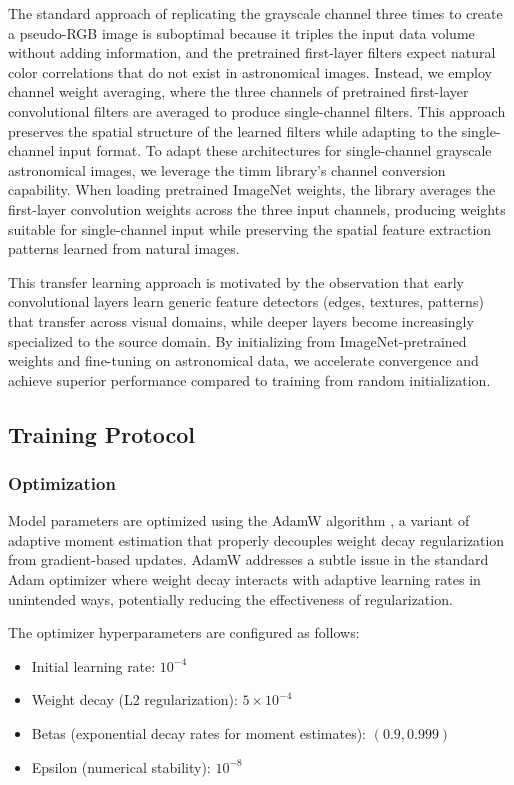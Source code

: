 \documentclass[11pt,a4paper]{article}
\begin{document}
The standard approach of replicating the grayscale channel three times to create a pseudo-RGB image is suboptimal because it triples the input data volume without adding information, and the pretrained first-layer filters expect natural color correlations that do not exist in astronomical images. Instead, we employ channel weight averaging, where the three channels of pretrained first-layer convolutional filters are averaged to produce single-channel filters. This approach preserves the spatial structure of the learned filters while adapting to the single-channel input format. To adapt these architectures for single-channel grayscale astronomical images, we leverage the timm library's channel conversion capability. When loading pretrained ImageNet weights, the library averages the first-layer convolution weights across the three input channels, producing weights suitable for single-channel input while preserving the spatial feature extraction patterns learned from natural images.

This transfer learning approach is motivated by the observation that early convolutional layers learn generic feature detectors (edges, textures, patterns) that transfer across visual domains, while deeper layers become increasingly specialized to the source domain. By initializing from ImageNet-pretrained weights and fine-tuning on astronomical data, we accelerate convergence and achieve superior performance compared to training from random initialization.

\subsection{Training Protocol}

\subsubsection{Optimization}

Model parameters are optimized using the AdamW algorithm \citep{loshchilov2019decoupled}, a variant of adaptive moment estimation that properly decouples weight decay regularization from gradient-based updates. AdamW addresses a subtle issue in the standard Adam optimizer where weight decay interacts with adaptive learning rates in unintended ways, potentially reducing the effectiveness of regularization.

The optimizer hyperparameters are configured as follows:
\begin{itemize}
    \item Initial learning rate: $10^{-4}$
    \item Weight decay (L2 regularization): $5 \times 10^{-4}$
    \item Betas (exponential decay rates for moment estimates): $(0.9, 0.999)$
    \item Epsilon (numerical stability): $10^{-8}$
\end{itemize}
\end{document}
